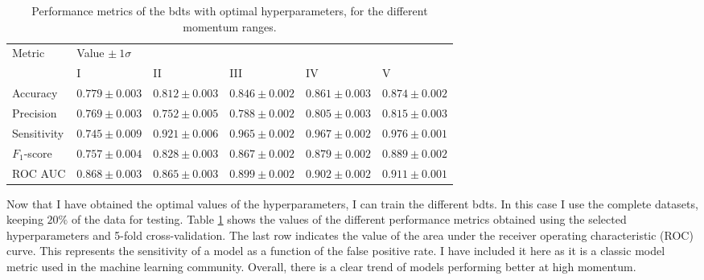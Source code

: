 \begin{table}[t]
	\caption{Performance metrics of the \gls{bdt}s with optimal hyperparameters, for the different momentum ranges.}
	\begin{center}
		\begin{small}
			\begin{tabular}{l|lllll}
				\multirow{2}{*}{Metric} & \multicolumn{5}{l}{Value $\pm ~ 1\sigma$}                                                                \\[2mm] \cline{2-6}
										& \rule{0pt}{1.1\normalbaselineskip}I                 & II                & III               & IV                & V                 \\[2mm] \hline
										\rule{0pt}{1.1\normalbaselineskip}Accuracy                & $0.779 \pm 0.003$ & $0.812 \pm 0.003$ & $0.846 \pm 0.002$ & $0.861 \pm 0.003$ & $0.874 \pm 0.002$ \\[2mm]
				Precision               & $0.769 \pm 0.003$ & $0.752 \pm 0.005$ & $0.788 \pm 0.002$ & $0.805 \pm 0.003$ & $0.815 \pm 0.003$ \\[2mm]
				Sensitivity             & $0.745 \pm 0.009$ & $0.921 \pm 0.006$ & $0.965 \pm 0.002$ & $0.967 \pm 0.002$ & $0.976 \pm 0.001$ \\[2mm]
				$F_{1}$-score           & $0.757 \pm 0.004$ & $0.828 \pm 0.003$ & $0.867 \pm 0.002$ & $0.879 \pm 0.002$ & $0.889 \pm 0.002$ \\[2mm]
				ROC AUC                 & $0.868 \pm 0.003$ & $0.865 \pm 0.003$ & $0.899 \pm 0.002$ & $0.902 \pm 0.002$ & $0.911 \pm 0.001$
			\end{tabular}
		\end{small}
	\end{center}
	\label{tab:bdt_metrics}
\end{table}

Now that I have obtained the optimal values of the hyperparameters, I can train the different \gls{bdt}s. In this case I use the complete datasets, keeping $20\%$ of the data for testing. Table \ref{tab:bdt_metrics} shows the values of the different performance metrics obtained using the selected hyperparameters and 5-fold cross-validation. The last row indicates the value of the area under the receiver operating characteristic (ROC) curve. This represents the sensitivity of a model as a function of the false positive rate. I have included it here as it is a classic model metric used in the machine learning community. Overall, there is a clear trend of models performing better at high momentum.

